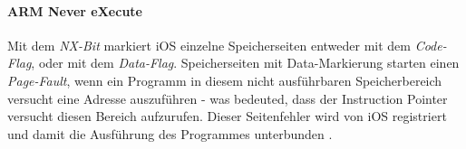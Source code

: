 		\paragraph{ARM Never eXecute}
			Mit dem \textsl{NX-Bit} markiert iOS einzelne Speicherseiten entweder mit dem
			\textsl{Code-Flag}, oder mit dem \textsl{Data-Flag}. Speicherseiten mit
			Data-Markierung starten einen \textsl{Page-Fault}, wenn ein Programm in
			diesem nicht ausführbaren Speicherbereich versucht eine Adresse auszuführen
			- was bedeuted, dass der Instruction Pointer versucht diesen Bereich
			aufzurufen. Dieser Seitenfehler wird von iOS registriert und damit die
			Ausführung des Programmes unterbunden \cite[S. 310]{Levin2012}.